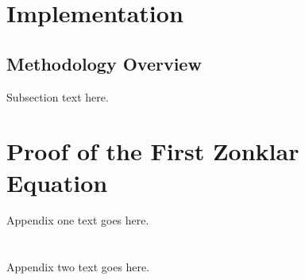 \documentclass[journal]{IEEEtran}
\begin{document}
\section{Implementation}

\subsection{Methodology Overview}
Subsection text here.









%


\appendices
\section{Proof of the First Zonklar Equation}
Appendix one text goes here.

\section{}
Appendix two text goes here.
\end{document}
